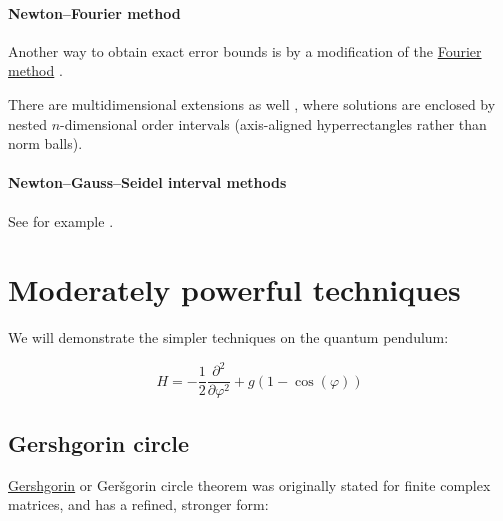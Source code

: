 \documentclass{article}
\theoremstyle{definition}
\begin{document}
\paragraph{Newton--Fourier method}

Another way to obtain exact error bounds is by a modification of the
\href{https://en.wikipedia.org/wiki/Newton\%27s_method#Fourier_conditions}
{Fourier method}
\cite{book:AtkinsonNumericalAnalysis,book:OstrowskiSolutionEquations}.

There are multidimensional extensions as well \cite{paper:Potra1987},
where solutions are enclosed by nested $n$-dimensional order intervals
(axis-aligned hyperrectangles rather than norm balls).

\paragraph{Newton--Gauss--Seidel interval methods}

See for example \cite{paper:Kearfott1990Preconditioners}.




\section{Moderately powerful techniques}

We will demonstrate the simpler techniques on the quantum pendulum:

\begin{equation}
    H = -\frac{1}{2} \frac{\partial^2}{\partial\varphi^2} + g (1-\cos(\varphi))
\end{equation}

\subsection{Gershgorin circle}

\href{https://en.wikipedia.org/wiki/Gershgorin_circle_theorem}{Gershgorin} or Ger{\v{s}}gorin circle theorem \cite{book:Varga2004Gersgorin,notes:Meckes2019MatrixAnalysis,book:GolubVanLoan1996,book:HornJohnson2013MatrixAnalysis} was originally stated for finite complex matrices, and has a refined, stronger form:
\end{document}
